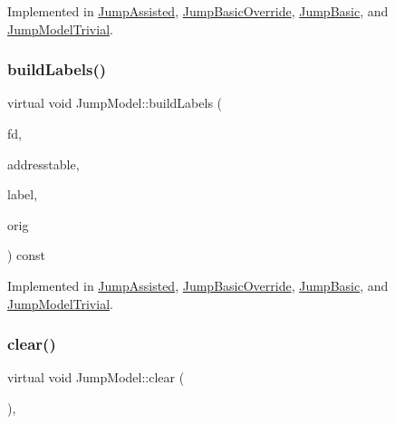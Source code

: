 Implemented in \mbox{\hyperlink{class_jump_assisted_aff52f4a983f867d9bd105a6856e473a5}{Jump\+Assisted}}, \mbox{\hyperlink{class_jump_basic_override_ad9a026df124c7e57722bdc1903033ebb}{Jump\+Basic\+Override}}, \mbox{\hyperlink{class_jump_basic_a42533b11d12a5f819bb88abb21037d94}{Jump\+Basic}}, and \mbox{\hyperlink{class_jump_model_trivial_a598ff420975134b8921c4a5ade192e0f}{Jump\+Model\+Trivial}}.

\mbox{\label{class_jump_model_af8e7b936b4b51d87b7690693f756ffd6}} 
\subsubsection{\texorpdfstring{buildLabels()}{buildLabels()}}
{\footnotesize\ttfamily virtual void Jump\+Model\+::build\+Labels (\begin{DoxyParamCaption}\item[{\mbox{\hyperlink{class_funcdata}{Funcdata}} $\ast$}]{fd,  }\item[{vector$<$ \mbox{\hyperlink{class_address}{Address}} $>$ \&}]{addresstable,  }\item[{vector$<$ \mbox{\hyperlink{types_8h_a2db313c5d32a12b01d26ac9b3bca178f}{uintb}} $>$ \&}]{label,  }\item[{const \mbox{\hyperlink{class_jump_model}{Jump\+Model}} $\ast$}]{orig }\end{DoxyParamCaption}) const\hspace{0.3cm}{\ttfamily [pure virtual]}}



Implemented in \mbox{\hyperlink{class_jump_assisted_aa8d0c353dd73697469c552b04146efe6}{Jump\+Assisted}}, \mbox{\hyperlink{class_jump_basic_override_a1fff9a672edb2225dae051d7ed6b57b5}{Jump\+Basic\+Override}}, \mbox{\hyperlink{class_jump_basic_ad3c8a1257f973c18e25935ee932076c4}{Jump\+Basic}}, and \mbox{\hyperlink{class_jump_model_trivial_a2f156e909104f7a992e61a288e207c08}{Jump\+Model\+Trivial}}.

\mbox{\label{class_jump_model_ab733e55fd77fcbafb94269b0dc0f8088}} 
\subsubsection{\texorpdfstring{clear()}{clear()}}
{\footnotesize\ttfamily virtual void Jump\+Model\+::clear (\begin{DoxyParamCaption}\item[{void}]{ }\end{DoxyParamCaption})\hspace{0.3cm}{\ttfamily [inline]}, {\ttfamily [virtual]}}



